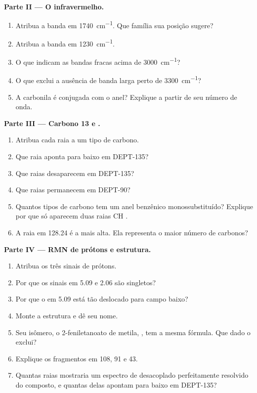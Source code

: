 \begin{problem}
\medskip
\noindent\textbf{Parte II --- O infravermelho.}
\begin{enumerate}[resume]
  \item Atribua a banda em \qty{1740}{cm^{-1}}. Que família sua posição sugere?
  \item Atribua a banda em \qty{1230}{cm^{-1}}.
  \item O que indicam as bandas fracas acima de \qty{3000}{cm^{-1}}?
  \item O que exclui a ausência de banda larga perto de \qty{3300}{cm^{-1}}?
  \item A carbonila é conjugada com o anel? Explique a partir de seu número de onda.
\end{enumerate}

\medskip
\noindent\textbf{Parte III --- Carbono 13 e .}
\begin{enumerate}[resume]
  \item Atribua cada raia a um tipo de carbono.
  \item Que raia aponta para baixo em DEPT-135?
  \item Que raias desaparecem em DEPT-135?
  \item Que raias permanecem em DEPT-90?
  \item Quantos tipos de carbono tem um anel benzênico monossubstituído? Explique por que só aparecem
        duas raias CH .
  \item A raia em 128.24 é a mais alta. Ela representa o maior número de carbonos?
\end{enumerate}

\medskip
\noindent\textbf{Parte IV --- RMN de prótons e estrutura.}
\begin{enumerate}[resume]
  \item Atribua os três sinais de prótons.
  \item Por que os sinais em 5.09 e 2.06 são singletos?
  \item Por que o  em 5.09 está tão deslocado para campo baixo?
  \item Monte a estrutura e dê seu nome.
  \item Seu isômero, o 2-feniletanoato de metila, , tem a mesma fórmula. Que dado o
        exclui?
  \item Explique os fragmentos em 108, 91 e 43.
  \item Quantas raias mostraria um espectro de  desacoplado perfeitamente resolvido do
        composto, e quantas delas apontam para baixo em DEPT-135?
\end{enumerate}
\end{problem}

